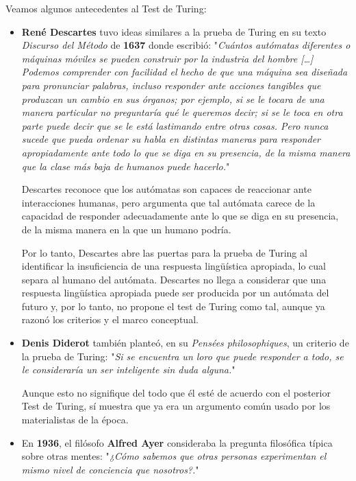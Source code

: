 \documentclass[a4paper, 11pt]{article} %
\begin{document}
Veamos algunos antecedentes al Test de Turing:
\begin{itemize}
    \item \textbf{René Descartes} tuvo ideas similares a la prueba de Turing en su texto \textit{Discurso del Método} de \textbf{1637} donde escribió: "\textit{Cuántos autómatas diferentes o máquinas móviles se pueden construir por la industria del hombre […] Podemos comprender con facilidad el hecho de que una máquina sea diseñada para pronunciar palabras, incluso responder ante acciones tangibles que produzcan un cambio en sus órganos; por ejemplo, si se le tocara de una manera particular no preguntaría qué le queremos decir; si se le toca en otra parte puede decir que se le está lastimando entre otras cosas. Pero nunca sucede que pueda ordenar su habla en distintas maneras para responder apropiadamente ante todo lo que se diga en su presencia, de la misma manera que la clase más baja de humanos puede hacerlo.}"
    
    Descartes reconoce que los autómatas son capaces de reaccionar ante interacciones humanas, pero argumenta que tal autómata carece de la capacidad de responder adecuadamente ante lo que se diga en su presencia, de la misma manera en la que un humano podría.
    
    Por lo tanto, Descartes abre las puertas para la prueba de Turing al identificar la insuficiencia de una respuesta lingüística apropiada, lo cual separa al humano del autómata. Descartes no llega a considerar que una respuesta lingüística apropiada puede ser producida por un autómata del futuro y, por lo tanto, no propone el test de Turing como tal, aunque ya razonó los criterios y el marco conceptual.
    
    \item \textbf{Denis Diderot} también planteó, en su \textit{Pensées philosophiques}, un criterio de la prueba de Turing: "\textit{Si se encuentra un loro que puede responder a todo, se le consideraría un ser inteligente sin duda alguna.}"
    
    Aunque esto no signifique del todo que él esté de acuerdo con el posterior Test de Turing, sí muestra que ya era un argumento común usado por los materialistas de la época.
    
    \item En \textbf{1936}, el filósofo \textbf{Alfred Ayer} consideraba la pregunta filosófica típica sobre otras mentes: "\textit{¿Cómo sabemos que otras personas experimentan el mismo nivel de conciencia que nosotros?.}"
    

\end{itemize}
\end{document}
